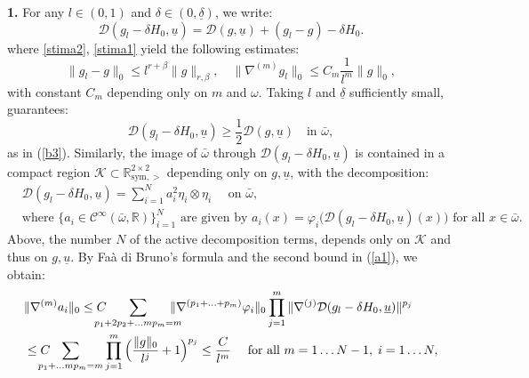 \documentclass[reqno,twoside,11pt]{amsart}
\newcommand{\sym}{\mathrm{sym}}
\newcommand{\R}{\mathbb{R}}
\numberwithin{equation}{section}
\theoremstyle{plain}
\theoremstyle{definition}
\begin{document}
{\bf 1.} For any $l\in (0,1)$ and $\delta\in (0, \underline \delta)$, we write:
$$\mathcal{D}(g_l-\delta H_0, \underline u) = \mathcal{D}(g,\underline
u) + (g_l-g) -\delta H_0.$$
where \ref{stima2}, \ref{stima1} yield the following estimates: 
\begin{equation}\label{a1}
\|g_l-g\|_0\leq l^{r+\beta}\|g\|_{r,\beta}, \quad
\|\nabla^{(m)}g_l\|_0\leq C_m\frac{1}{l^m}\|g\|_0,
\end{equation}
with constant $C_m$ depending only on $m$ and $\omega$.
Taking $l$ and $\underline\delta$ sufficiently small, guarantees:
\begin{equation}\label{b3}
\mathcal{D}(g_l - \delta H_0,\underline u)\geq
  \frac{1}{2}\mathcal{D}(g,\underline u)\quad\mbox{in } \bar\omega,
\end{equation}
as in (\ref{b3}). Similarly, the image of $\bar\omega$ through $\mathcal{D}(g_l - \delta
   H_0,\underline u)$ is contained in a compact region
   $\mathcal{K}\subset\R^{2\times 2}_{\sym,>}$ depending only on
   $g,\underline u$, with the decomposition: 
\begin{equation*}
\begin{split}
& \mathcal{D}(g_l - \delta H_0, \underline u) = \sum_{i=1}^N
a_i^2\eta_i\otimes\eta_i \quad\mbox{ on } \bar\omega,\\
& \mbox{where } \{a_i\in\mathcal{C}^\infty(\bar\omega,\R)\}_{i=1}^N
\mbox{ are given by } a_i(x) = \varphi_i\Big(\mathcal{D}(g_l-\delta
H_0, \underline u)(x)\Big) \mbox{ for all } x\in\bar\omega.
\end{split}
\end{equation*}
Above, the number $N$ of the active decomposition terms,
depends only on $\mathcal{K}$ and thus on $g, \underline u$.
By Fa\`a di Bruno's formula and the second bound in (\ref{a1}), we obtain:
\begin{equation}\label{441}
\begin{split}
& \|\nabla^{(m)} a_i\|_0 \leq C\hspace{-4mm}\sum_{p_1+2p_2+\ldots mp_m=m}
\hspace{-4mm} \|\nabla^{(p_1+\ldots +p_m)
}\varphi_i\|_0\prod_{j=1}^m\|\nabla^{(j)}\mathcal{D}(g_l - \delta H_0,\underline u) \|^{p_j}
\\ & \leq C \hspace{-4mm}\sum_{p_1+\ldots mp_m=m}
\prod_{j=1}^m\Big(\frac{\|g\|_{0}}{l^j} +1\Big)^{p_j}\leq
\frac{C}{l^m} \quad\mbox{ for all } m=1\ldots N-1, \;i=1\ldots N,
\end{split}
\end{equation}
\end{document}
